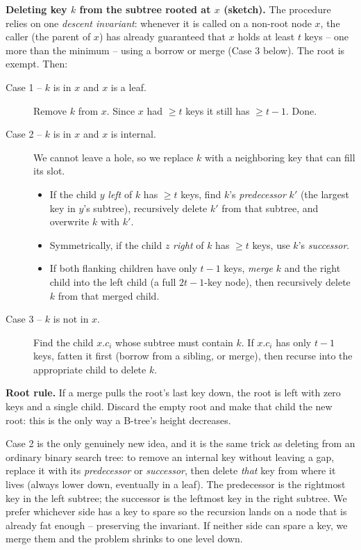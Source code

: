 \begin{formalbox}
\textbf{Deleting key $k$ from the subtree rooted at $x$ (sketch).} The procedure
relies on one \emph{descent invariant}: whenever it is called on a non-root node
$x$, the caller (the parent of $x$) has already guaranteed that $x$ holds at least
$t$ keys -- one more than the minimum -- using a borrow or merge (Case 3 below).
The root is exempt. Then:
\begin{description}
\item[Case 1 -- $k$ is in $x$ and $x$ is a leaf.] Remove $k$ from $x$. Since
$x$ had $\ge t$ keys it still has $\ge t-1$. Done.
\item[Case 2 -- $k$ is in $x$ and $x$ is internal.] We cannot leave a hole, so we
replace $k$ with a neighboring key that can fill its slot.
\begin{itemize}
\item[\emph{2a.}] If the child $y$ \emph{left} of $k$ has $\ge t$ keys, find $k$'s
\emph{predecessor} $k'$ (the largest key in $y$'s subtree), recursively delete $k'$
from that subtree, and overwrite $k$ with $k'$.
\item[\emph{2b.}] Symmetrically, if the child $z$ \emph{right} of $k$ has $\ge t$
keys, use $k$'s \emph{successor}.
\item[\emph{2c.}] If both flanking children have only $t-1$ keys, \emph{merge} $k$
and the right child into the left child (a full $2t-1$-key node), then recursively
delete $k$ from that merged child.
\end{itemize}
\item[Case 3 -- $k$ is not in $x$.] Find the child $x.c_i$ whose subtree must
contain $k$. If $x.c_i$ has only $t-1$ keys, fatten it first (borrow from a sibling,
or merge), then recurse into the appropriate child to delete $k$.
\end{description}
\textbf{Root rule.} If a merge pulls the root's last key down, the root is left
with zero keys and a single child. Discard the empty root and make that child the
new root: this is the only way a B-tree's height decreases.
\end{formalbox}

\begin{intuitionbox}
Case 2 is the only genuinely new idea, and it is the same trick as deleting from an
ordinary binary search tree: to remove an internal key without leaving a gap,
replace it with its \emph{predecessor} or \emph{successor}, then delete \emph{that}
key from where it lives (always lower down, eventually in a leaf). The predecessor
is the rightmost key in the left subtree; the successor is the leftmost key in the
right subtree. We prefer whichever side has a key to spare so the recursion lands on
a node that is already fat enough -- preserving the invariant. If neither side can
spare a key, we merge them and the problem shrinks to one level down.
\end{intuitionbox}

